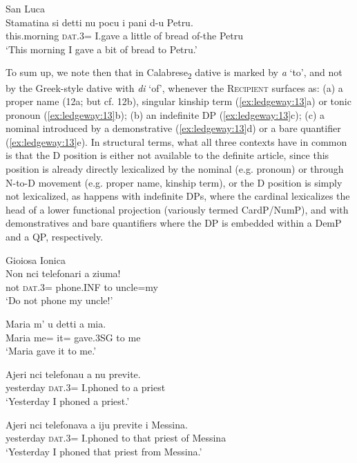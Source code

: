 \documentclass[output=paper,modfonts,nonflat]{langsci/langscibook}
\begin{document}
\ex San Luca\\
 \gll Stamatina        si          detti  nu  pocu   i   pani   d-u   Petru.\\
        this.morning   \textsc{dat}.3=  I.gave   a  little   of   bread   of-the   Petru\\
        \glt `This morning I gave a bit of bread to Petru.'
        \z
        \z

To sum up, we note then that in Calabrese\textsubscript{2} dative is marked by \textit{a} ‘to’, and not by the Greek-style dative with \textit{di} ‘of’, whenever the \textsc{Recipient} surfaces as: (a) a proper name (12a; but cf. 12b), singular kinship term (\ref{ex:ledgeway:13}a) or tonic pronoun (\ref{ex:ledgeway:13}b); (b) an indefinite DP (\ref{ex:ledgeway:13}c); (c) a nominal introduced by a demonstrative (\ref{ex:ledgeway:13}d) or a bare quantifier (\ref{ex:ledgeway:13}e). In structural terms, what all three contexts have in common is that the D position is either not available to the definite article, since this position is already directly lexicalized by the nominal (e.g. pronoun) or through N-to-D movement (e.g. proper name, kinship term), or the D position is simply not lexicalized, as happens with indefinite DPs, where the cardinal lexicalizes the head of a lower functional projection (variously termed CardP/NumP), and with demonstratives and bare quantifiers where the DP is embedded within a DemP and a QP, respectively. 

\ea\label{ex:ledgeway:13}
  Gioiosa Ionica\\
\ea
	\gll Non  nci  telefonari  a  ziuma!\\
      not  \textsc{dat}.3=  phone.INF   to  uncle=my\\
      \glt `Do not phone my uncle!'

\ex
	\gll Maria  m’  u  detti  a  mia.\\
    Maria  me=  it=  gave.3SG   to  me\\
    \glt `Maria gave it to me.'

\ex
	\gll Ajeri  nci  telefonau  a  nu   previte.\\
      yesterday  \textsc{dat}.3=  I.phoned  to  a  priest \\
      \glt `Yesterday I phoned a priest.'

\ex
	\gll Ajeri  nci   telefonava  a  iju    previte   i   Messina.\\
      yesterday  \textsc{dat}.3=  I.phoned  to  that   priest   of   Messina\\
      \glt `Yesterday I phoned that priest from Messina.'
\end{document}
